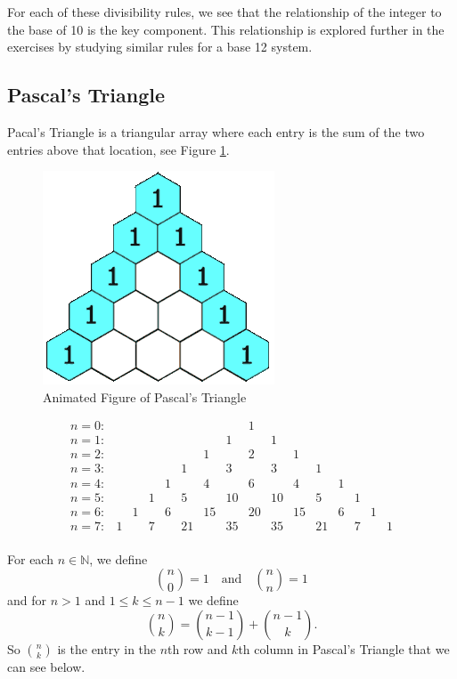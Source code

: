 \documentclass[
]{book}
\theoremstyle{definition}
\theoremstyle{definition}
\theoremstyle{definition}
\theoremstyle{definition}
\theoremstyle{remark}
\begin{document}
For each of these divisibility rules, we see that the relationship of the integer to the base of 10 is the key component. This relationship is explored further in the exercises by studying similar rules for a base 12 system.

\hypertarget{pascals-triangle}{%
\subsection{Pascal's Triangle}\label{pascals-triangle}}

Pacal's Triangle is a triangular array where each entry is the sum of the two entries above that location, see Figure \ref{fig:pascalgif}.

\begin{figure}

{\centering \includegraphics[width=0.3\linewidth]{images/PascalTriangleAnimated2} 

}

\caption{Animated Figure of Pascal's Triangle}\label{fig:pascalgif}
\end{figure}

\[\begin{array}{lccccccccccccccc}
n=0: & & & & & & & & 1 & & & & & & & \\
n=1: & & & & & & & 1 &  & 1 & & & & & & \\
n=2: & & & & & & 1 &  & 2 &  & 1 & & & & & \\
n=3: & & & & & 1 &  & 3 &  & 3  &  & 1 & & & & \\
n=4: & & & & 1 &  & 4 &  & 6  & & 4 &  & 1 & & & \\
n=5: & & & 1 &  & 5 &  & 10  &   & 10 &  & 5  &  & 1 & & \\
n=6: & & 1 &  & 6 &  & 15  &  & 20  &  & 15  & & 6 &  & 1 & \\
n=7: & 1&  & 7 &  & 21  & & 35 &  & 35 &  & 21 &  & 7 &  & 1 \\
\end{array}\]

For each \(n\in \mathbb{N}\), we define \[\binom{n}{0} = 1 \quad \mbox{and} \quad \binom{n}{n}=1\] and for \(n>1\) and \(1\leq k \leq n-1\) we define \[\binom{n}{k} = \binom{n-1}{k-1} + \binom{n-1}{k}.\] So \(\binom{n}{k}\) is the entry in the \(n\)th row and \(k\)th column in Pascal's Triangle that we can see below.
\end{document}

